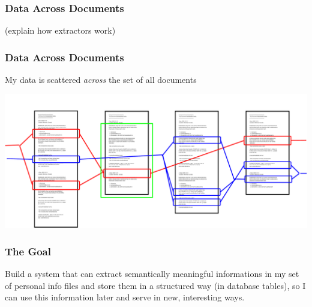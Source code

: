 \documentclass[compress,trans]{beamer}
\begin{document}
\begin{frame}[fragile]
  \frametitle{Data Across Documents}




  (explain how extractors work)

\end{frame}






\begin{frame}[fragile]
  \frametitle{Data Across Documents}

  My data is scattered \emph{across} the set of all documents

  \includegraphics[width=1.0\textwidth]{across.pdf}

\end{frame}


% 
% 
% 
%
% 



\begin{frame}[fragile]
  \frametitle{The Goal}

  Build a system that can extract semantically meaningful informations in my set
  of personal info files and store them in a structured way (in database
  tables), so I can use this information later and serve in new, interesting
  ways.

\end{frame}
\end{document}
